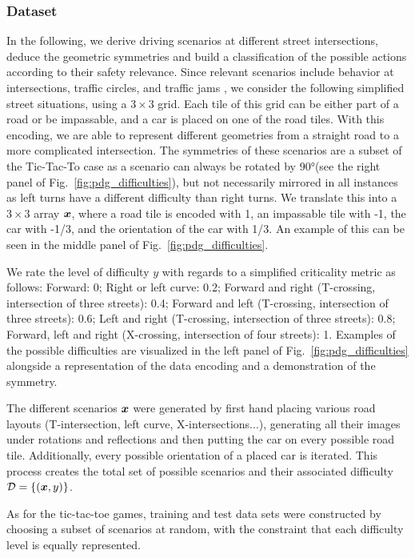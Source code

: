 \documentclass[a4paper,twocolumn,notitlepage,nofootinbib,superscriptaddress,floatfix]{revtex4-2}
\begin{document}
\subsubsection*{Dataset}
In the following, we derive driving scenarios at different street intersections, deduce the geometric symmetries and build a classification of the possible actions according to their safety relevance. Since relevant scenarios include behavior at intersections, traffic circles, and traffic jams \cite{schwab2019car}, we consider the following simplified street situations, using a $3\times3$ grid. 
Each tile of this grid can be either part of a road or be impassable, and a car is placed on one of the road tiles. With this encoding, we are able to represent different geometries from a straight road to a more complicated intersection. The symmetries of these scenarios are a subset of the Tic-Tac-To case as a scenario can always be rotated by 90°(see the right panel of Fig.~\ref{fig:pdg_difficulties}), but not necessarily mirrored in all instances as left turns have a different difficulty than right turns. 
We translate this into a $3\times3$ array $\boldsymbol{x}$, where a road tile is encoded with 1, an impassable tile with -1, the car with -1/3, and the orientation of the car with 1/3. An example of this can be seen in the middle panel of Fig.~\ref{fig:pdg_difficulties}. 

We rate the level of difficulty $y$ with regards to a simplified criticality metric as follows: Forward: 0; Right or left curve: 0.2; Forward and right (T-crossing, intersection of three streets): 0.4; Forward and left (T-crossing, intersection of three streets): 0.6; Left and right (T-crossing, intersection of three streets): 0.8; Forward, left and right (X-crossing, intersection of four streets): 1. 
Examples of the possible difficulties are visualized in the left panel of Fig.~\ref{fig:pdg_difficulties} alongside a representation of the data encoding and a demonstration of the symmetry.

The different scenarios $\boldsymbol{x}$ were generated by first hand placing various road layouts (T-intersection, left curve, X-intersections...), generating all their images under rotations and reflections and then putting the car on every possible road tile. Additionally, every possible orientation of a placed car is iterated. This process creates the total set of possible scenarios and their associated difficulty $\mathcal{D} = \{(\boldsymbol{x}, y)\}$.

As for the tic-tac-toe games, training and test data sets were constructed by choosing a subset of scenarios at random, with the constraint that each difficulty level is equally represented.
\end{document}
